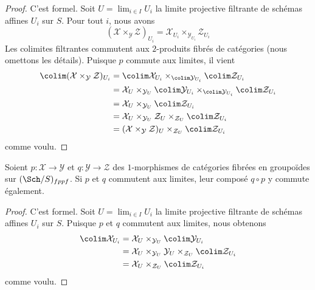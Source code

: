 \begin{proof}
C'est formel. Soit $U = \lim_{i \in I} U_i$ la limite projective filtrante
de schémas affines $U_i$ sur $S$. Pour tout $i$, nous avons
$$
(\mathcal{X} \times_\mathcal{Y} \mathcal{Z})_{U_i} =
\mathcal{X}_{U_i} \times_{\mathcal{Y}_{U_i}} \mathcal{Z}_{U_i}
$$
Les colimites filtrantes commutent aux $2$-produits fibrés de catégories
(nous omettons les détails). Puisque $p$ commute aux limites, il vient
\begin{align*}
\colim (\mathcal{X} \times_\mathcal{Y} \mathcal{Z})_{U_i}
& =
\colim \mathcal{X}_{U_i} \times_{\colim \mathcal{Y}_{U_i}}
\colim \mathcal{Z}_{U_i} \\
& =
\mathcal{X}_U \times_{\mathcal{Y}_U} \colim \mathcal{Y}_{U_i}
\times_{\colim \mathcal{Y}_{U_i}}
\colim \mathcal{Z}_{U_i} \\
& =
\mathcal{X}_U \times_{\mathcal{Y}_U} \colim \mathcal{Z}_{U_i} \\
& =
\mathcal{X}_U \times_{\mathcal{Y}_U} \mathcal{Z}_U \times_{\mathcal{Z}_U}
\colim \mathcal{Z}_{U_i} \\
& =
(\mathcal{X} \times_\mathcal{Y} \mathcal{Z})_U \times_{\mathcal{Z}_U}
\colim \mathcal{Z}_{U_i}
\end{align*}
comme voulu.
\end{proof}

\begin{lemma}
\label{lemma-composition-limit-preserving}
Soient $p : \mathcal{X} \to \mathcal{Y}$ et
$q : \mathcal{Y} \to \mathcal{Z}$ des $1$-morphismes de catégories fibrées
en groupoïdes sur $(\Sch/S)_{fppf}$. Si $p$ et $q$ commutent aux limites,
leur composé $q \circ p$ y commute également.
\end{lemma}

\begin{proof}
C'est formel. Soit $U = \lim_{i \in I} U_i$ la limite projective filtrante
de schémas affines $U_i$ sur $S$. Puisque $p$ et $q$ commutent aux limites,
nous obtenons
\begin{align*}
\colim \mathcal{X}_{U_i}
& =
\mathcal{X}_U \times_{\mathcal{Y}_U} \colim \mathcal{Y}_{U_i} \\
& =
\mathcal{X}_U \times_{\mathcal{Y}_U} \mathcal{Y}_U
\times_{\mathcal{Z}_U} \colim \mathcal{Z}_{U_i} \\
& =
\mathcal{X}_U \times_{\mathcal{Z}_U} \colim \mathcal{Z}_{U_i}
\end{align*}
comme voulu.
\end{proof}

